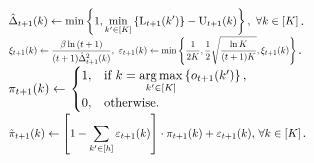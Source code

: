 \begin{algorithm}[t]
\begin{algorithmic}
		\STATE $\scalemath{0.8}{ \hat{\Delta}_{t+1}(k) \gets \min\left\{ 1,  \min\limits_{k^\prime \in \left[K\right]}\left\{ \lcb_{t+1}(k^\prime) \right\}  - \ucb_{t+1}(k)\right\}, \ \forall k \in [K] }  $.
		\STATE $\scalemath{0.65}{ \xi_{t+1}(k) \gets \frac{\beta \ln{(t+1)}}{(t+1) \hat{\Delta}_{t+1}^2(k)}, \ \varepsilon_{t+1}(k) \gets \min\left\{ \frac{1}{2 K}, \frac{1}{2} \sqrt{\frac{\ln{K}}{(t+1) K}},  \xi_{t+1}(k) \right\} }$.
		\STATE $\scalemath{0.9}{ \pi_{t+1}(k) \gets \left. 
		    \begin{cases}
		    1, & \text{if } k = \argmax\limits_{k^\prime \in \left[K\right]}\left\{ o_{t+1}(k^\prime)\right\}, \\
		    0, & \text{otherwise}.
		    \end{cases}
		    \right. }$
		\STATE $\scalemath{0.8}{ \tilde{\pi}_{t+1}(k) \gets \left[ 1 - \sum\limits_{k^\prime \in [h]}{\varepsilon_{t+1}(k)} \right] \cdot  \pi_{t+1}(k) + \varepsilon_{t+1}(k)$, $\forall k \in [K] }$.
		
		\ENDFOR
	\end{algorithmic}
\end{algorithm}





